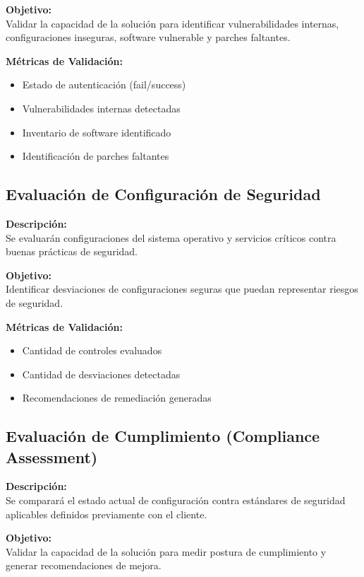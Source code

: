 \documentclass[a4paper]{article}
\begin{document}
    \textbf{Objetivo:}\\
    Validar la capacidad de la solución para identificar vulnerabilidades internas, configuraciones inseguras, software vulnerable y parches faltantes.

    \textbf{Métricas de Validación:}
    \begin{itemize}
        \item Estado de autenticación (fail/success)
        \item Vulnerabilidades internas detectadas
        \item Inventario de software identificado
        \item Identificación de parches faltantes
    \end{itemize}

    \subsection{Evaluación de Configuración de Seguridad}
    \textbf{Descripción:}\\
    Se evaluarán configuraciones del sistema operativo y servicios críticos contra buenas prácticas de seguridad.

    \textbf{Objetivo:}\\
    Identificar desviaciones de configuraciones seguras que puedan representar riesgos de seguridad.

    \textbf{Métricas de Validación:}
    \begin{itemize}
        \item Cantidad de controles evaluados
        \item Cantidad de desviaciones detectadas
        \item Recomendaciones de remediación generadas
    \end{itemize}

    \newpage

    \subsection{Evaluación de Cumplimiento (Compliance Assessment)}
    \textbf{Descripción:}\\
    Se comparará el estado actual de configuración contra estándares de seguridad aplicables definidos previamente con el cliente.

    \textbf{Objetivo:}\\
    Validar la capacidad de la solución para medir postura de cumplimiento y generar recomendaciones de mejora.
    
\end{document}
